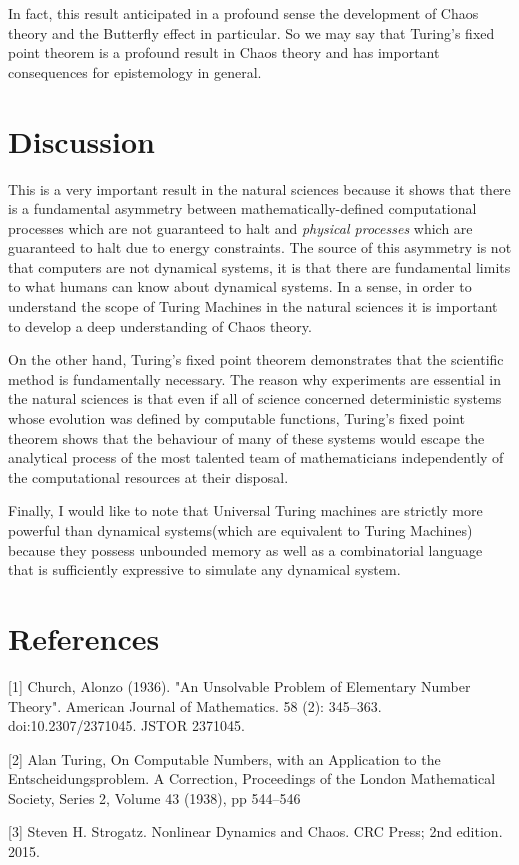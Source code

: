 \documentclass{article}
\begin{document}
In fact, this result anticipated in a profound sense the development of Chaos theory and the Butterfly effect in particular.
So we may say that Turing's fixed point theorem is a profound result in Chaos theory and has important consequences for epistemology in general.

\newpage

\section{Discussion}

This is a very important result in the natural sciences because it shows that there is a fundamental asymmetry between mathematically-defined computational processes which are not guaranteed to halt and \textit{physical processes} which are guaranteed to halt due to energy constraints. The source of this
asymmetry is not that computers are not dynamical systems, it is that there are fundamental limits to what humans can know about dynamical systems. In a sense, in order to understand the scope of Turing Machines in the natural sciences it is important to develop a deep understanding of Chaos theory.

On the other hand, Turing's fixed point theorem demonstrates that the scientific method is fundamentally necessary.
The reason why experiments are essential in the natural sciences is that even if all of science concerned deterministic
systems whose evolution was defined by computable functions, Turing's fixed point theorem shows that the behaviour
of many of these systems would escape the analytical process of the most talented team of mathematicians independently
of the computational resources at their disposal. 

Finally, I would like to note that Universal Turing machines are strictly more powerful than dynamical systems(which are equivalent to Turing Machines) because they possess unbounded memory as well as a combinatorial language that is sufficiently expressive to simulate any dynamical system. 

\section*{References}

\small

[1] Church, Alonzo (1936). "An Unsolvable Problem of Elementary Number Theory". American Journal of Mathematics. 58 (2): 345–363. doi:10.2307/2371045. JSTOR 2371045.

[2] Alan Turing, On Computable Numbers, with an Application to the Entscheidungsproblem. A Correction, Proceedings of the London Mathematical Society, Series 2, Volume 43 (1938), pp 544–546 

[3] Steven H. Strogatz. Nonlinear Dynamics and Chaos. CRC Press; 2nd edition. 2015.
\end{document}
